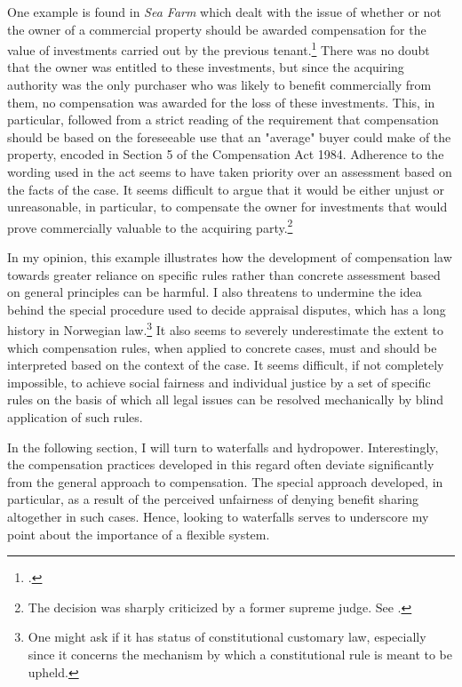 One example is found in \emph{Sea Farm} which dealt with the issue of whether or not the owner of a commercial property should be awarded compensation for the value of investments carried out by the previous tenant.\footcite{seafarm08} There was no doubt that the owner was entitled to these investments, but since the acquiring authority was the only purchaser who was likely to benefit commercially from them, no compensation was awarded for the loss of these investments. This, in particular, followed from a strict reading of the requirement that compensation should be based on the foreseeable use that an "average" buyer could make of the property, encoded in Section 5 of the Compensation Act 1984. Adherence to the wording used in the act seems to have taken priority over an assessment based on the facts of the case. It seems difficult to argue that it would be either unjust or unreasonable, in particular, to compensate the owner for investments that would prove commercially valuable to the acquiring party.\footnote{The decision was sharply criticized by a former supreme judge. See \cite{skoghoy08}.}

In my opinion, this example illustrates how the development of compensation law towards greater reliance on specific rules rather than concrete assessment based on general principles can be harmful. I also threatens to undermine the idea behind the special procedure used to decide appraisal disputes, which has a long history in Norwegian law.\footnote{One might ask if it has status of constitutional customary law, especially since it concerns the mechanism by which a constitutional rule is meant to be upheld.} It also seems to severely underestimate the extent to which compensation rules, when applied to concrete cases, must and should be interpreted based on the context of the case. It seems difficult, if not completely impossible, to achieve social fairness and individual justice by a set of specific rules on the basis of which all legal issues can be resolved mechanically by blind application of such rules. %

In the following section, I will turn to waterfalls and hydropower. Interestingly, the compensation practices developed in this regard often deviate significantly from the general approach to compensation. The special approach developed, in particular, as a result of the perceived unfairness of denying benefit sharing altogether in such cases. Hence, looking to waterfalls serves to underscore my point about the importance of a flexible system. 

